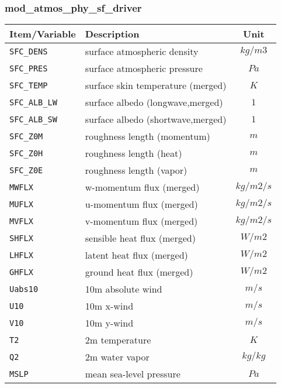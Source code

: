 \subsubsection{mod\_atmos\_phy\_sf\_driver}
 \begin{tabularx}{150mm}{|l|X|c|} \hline
 \rowcolor[gray]{0.9} Item/Variable & Description  & Unit \\ \hline
  \verb|SFC_DENS| & surface atmospheric density & $kg/m3$ \\\hline
  \verb|SFC_PRES| & surface atmospheric pressure & $Pa$ \\\hline
  \verb|SFC_TEMP| & surface skin temperature (merged) & $K$ \\\hline
  \verb|SFC_ALB_LW| & surface albedo (longwave,merged) & $1$ \\\hline
  \verb|SFC_ALB_SW| & surface albedo (shortwave,merged) & $1$ \\\hline
  \verb|SFC_Z0M| & roughness length (momentum) & $m$ \\\hline
  \verb|SFC_Z0H| & roughness length (heat) & $m$ \\\hline
  \verb|SFC_Z0E| & roughness length (vapor) & $m$ \\\hline
  \verb|MWFLX| & w-momentum flux (merged) & $kg/m2/s$ \\\hline
  \verb|MUFLX| & u-momentum flux (merged) & $kg/m2/s$ \\\hline
  \verb|MVFLX| & v-momentum flux (merged) & $kg/m2/s$ \\\hline
  \verb|SHFLX| & sensible heat flux (merged) & $W/m2$ \\\hline
  \verb|LHFLX| & latent heat flux (merged) & $W/m2$ \\\hline
  \verb|GHFLX| & ground heat flux (merged) & $W/m2$ \\\hline
  \verb|Uabs10| & 10m absolute wind & $m/s$ \\\hline
  \verb|U10| & 10m x-wind & $m/s$ \\\hline
  \verb|V10| & 10m y-wind & $m/s$ \\\hline
  \verb|T2 | & 2m temperature & $K$ \\\hline
  \verb|Q2 | & 2m water vapor & $kg/kg$ \\\hline
  \verb|MSLP| & mean sea-level pressure & $Pa$ \\\hline
 \end{tabularx}

